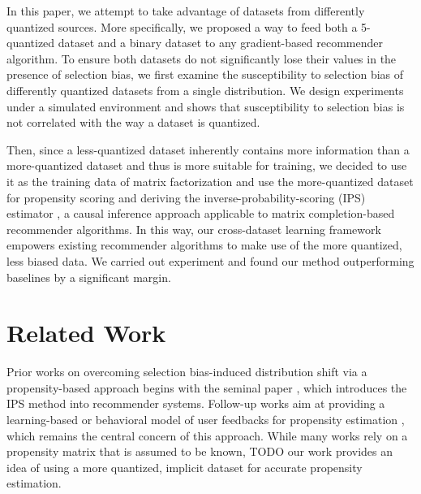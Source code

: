 \documentclass{article}
\begin{document}
In this paper, we attempt to take advantage of datasets from differently quantized sources. More specifically, we proposed a way to feed both a 5-quantized dataset and a binary dataset to any gradient-based recommender algorithm.  To ensure both datasets do not significantly lose their values in the presence of selection bias, we first examine the susceptibility to selection bias of differently quantized datasets from a single distribution. We design experiments under a simulated environment and shows that susceptibility to selection bias is not correlated with the way a dataset is quantized. 

Then, since a less-quantized dataset inherently contains more information than a more-quantized dataset \cite{widrow1996statistical} and thus is more suitable for training, we decided to use it as the training data of matrix factorization and use the more-quantized dataset for propensity scoring and deriving the inverse-probability-scoring (IPS) estimator \cite{thompson2012sampling} \cite{imbens2015causal}, a causal inference approach applicable to matrix completion-based recommender algorithms. In this way, our cross-dataset learning framework empowers existing recommender algorithms to make use of the more quantized, less biased data. We carried out experiment and found our method outperforming baselines by a significant margin.


\section{Related Work}
Prior works on overcoming selection bias-induced distribution shift via a propensity-based approach begins with the seminal paper \cite{schnabel2016recommendations}, which introduces the IPS method into recommender systems. Follow-up works aim at providing a learning-based or behavioral model of user feedbacks for propensity estimation \cite{joachims2017unbiased} \cite{yang2018unbiased}, which remains the central concern of this approach. While many works rely on a propensity matrix that is assumed to be known, TODO our work provides an idea of using a more quantized, implicit dataset for accurate propensity estimation.
\end{document}
